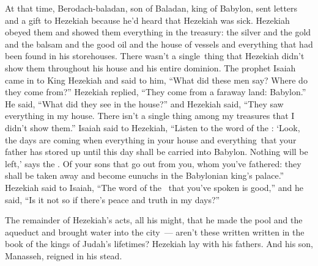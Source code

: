 \begin{inparaenum}
   At that time, Berodach-baladan, son of Baladan, king of Babylon, sent letters and a gift to Hezekiah because he'd heard that Hezekiah was sick.%
   Hezekiah obeyed them and showed them everything in the treasury: the silver and the gold and the balsam and the good oil and the house of vessels and everything that had been found in his storehouses. There wasn't a single\understood{}\ thing that Hezekiah didn't show them throughout his house and his entire dominion.%
   The prophet Isaiah came in to King Hezekiah and said to him, ``What did these men say? Where do they come from?'' Hezekiah replied, ``They come from a faraway land: Babylon.''%
   He said, ``What did they see in the house?'' and Hezekiah said, ``They saw everything in my house. There isn't a single thing among my treasures that I didn't show them.''%
   Isaiah said to Hezekiah, ``Listen to the word of the \lord:%
   `Look, the days are coming when everything in your house and everything\understood{}\ that your father has stored up until this day shall be carried into Babylon. Nothing will be left,' says the \lord.%
   Of your sons that go out from you, whom you've fathered: they shall be taken away and become eunuchs in the Babylonian king's palace.''%
   Hezekiah said to Isaiah, ``The word of the \lord\ that you've spoken is good,'' and he said, ``Is it not so if there's peace and truth in my days?''%

   The remainder of Hezekiah's acts, all his might, that he made the pool and the aqueduct and brought water into the city~--- aren't these written written in the book of the kings of Judah's lifetimes?%
   Hezekiah lay with his fathers. And his son, Manasseh, reigned in his stead.%
\end{inparaenum}
